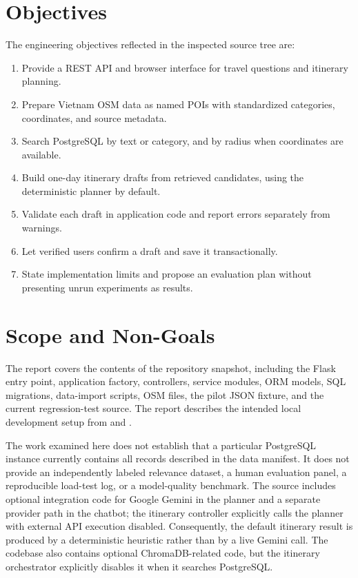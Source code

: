 \section{Objectives}

The engineering objectives reflected in the inspected source tree are:
\begin{enumerate}[leftmargin=1.8em,itemsep=2pt,parsep=0pt,topsep=3pt]
    \item Provide a REST API and browser interface for travel questions and itinerary planning.
    \item Prepare Vietnam OSM data as named POIs with standardized categories, coordinates, and source metadata.
    \item Search PostgreSQL by text or category, and by radius when coordinates are available.
    \item Build one-day itinerary drafts from retrieved candidates, using the deterministic planner by default.
    \item Validate each draft in application code and report errors separately from warnings.
    \item Let verified users confirm a draft and save it transactionally.
    \item State implementation limits and propose an evaluation plan without presenting unrun experiments as results.
\end{enumerate}

\section{Scope and Non-Goals}

The report covers the contents of the repository snapshot, including the Flask entry point, application factory, controllers, service modules, ORM models, SQL migrations, data-import scripts, OSM files, the pilot JSON fixture, and the current regression-test source. The report describes the intended local development setup from  and .

The work examined here does not establish that a particular PostgreSQL instance currently contains all records described in the data manifest. It does not provide an independently labeled relevance dataset, a human evaluation panel, a reproducible load-test log, or a model-quality benchmark. The source includes optional integration code for Google Gemini in the planner and a separate provider path in the chatbot; the itinerary controller explicitly calls the planner with external API execution disabled. Consequently, the default itinerary result is produced by a deterministic heuristic rather than by a live Gemini call. The codebase also contains optional ChromaDB-related code, but the itinerary orchestrator explicitly disables it when it searches PostgreSQL.

